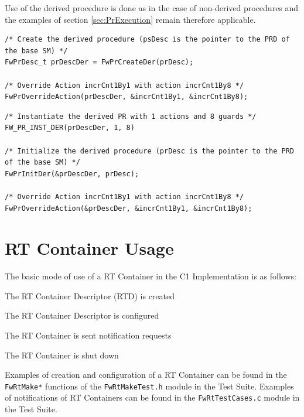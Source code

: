 \documentclass[a4paper,10pt]{article}
\let\stdsection\section
\renewcommand\section{\newpage\stdsection}
\newenvironment{fw_itemize}						%
{\begin{itemize}
  \setlength{\itemsep}{1mm}
  \setlength{\parskip}{0pt}
  \setlength{\parsep}{0pt}}
{\end{itemize}}
\begin{document}
Use of the derived procedure is done as in the case of non-derived procedures and the examples of section \ref{sec:PrExecution} 
remain therefore applicable.


\begin{lstlisting}
/* Create the derived procedure (psDesc is the pointer to the PRD of the base SM) */
FwPrDesc_t prDescDer = FwPrCreateDer(prDesc);

/* Override Action incrCnt1By1 with action incrCnt1By8 */
FwPrOverrideAction(prDescDer, &incrCnt1By1, &incrCnt1By8);

\end{lstlisting}


\begin{lstlisting}
/* Instantiate the derived PR with 1 actions and 8 guards */
FW_PR_INST_DER(prDescDer, 1, 8)

/* Initialize the derived procedure (prDesc is the pointer to the PRD of the base SM) */
FwPrInitDer(&prDescDer, prDesc);

/* Override Action incrCnt1By1 with action incrCnt1By8 */
FwPrOverrideAction(&prDescDer, &incrCnt1By1, &incrCnt1By8);
\end{lstlisting}


\section{RT Container Usage}\label{sec:rtUsage}

The basic mode of use of a RT Container in the C1 Implementation is as follows:

\begin{fw_itemize}
\item The RT Container Descriptor (RTD) is created
\item The RT Container Descriptor is configured
\item The RT Container is sent notification requests 
\item The RT Container is shut down
\end{fw_itemize}

Examples of creation and configuration of a RT Container can be found in the \texttt{FwRtMake*} functions of the \texttt{FwRtMakeTest.h} module in the Test Suite. Examples of notifications of RT Containers can be found in the \texttt{FwRtTestCases.c} module in the Test Suite.
\end{document}
